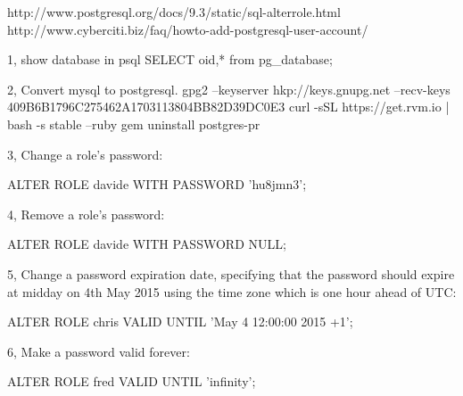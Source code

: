 http://www.postgresql.org/docs/9.3/static/sql-alterrole.html
http://www.cyberciti.biz/faq/howto-add-postgresql-user-account/

1, show database in psql
SELECT oid,* from pg_database;


2, Convert mysql to postgresql.
gpg2 --keyserver hkp://keys.gnupg.net --recv-keys 409B6B1796C275462A1703113804BB82D39DC0E3
curl -sSL https://get.rvm.io | bash -s stable --ruby
gem uninstall  postgres-pr

3, Change a role's password:

ALTER ROLE davide WITH PASSWORD 'hu8jmn3';

4, Remove a role's password:

ALTER ROLE davide WITH PASSWORD NULL;

5, Change a password expiration date, specifying that the password should expire at midday on 4th May 2015 using the time zone which is one hour ahead of UTC:

ALTER ROLE chris VALID UNTIL 'May 4 12:00:00 2015 +1';

6, Make a password valid forever:

ALTER ROLE fred VALID UNTIL 'infinity';


